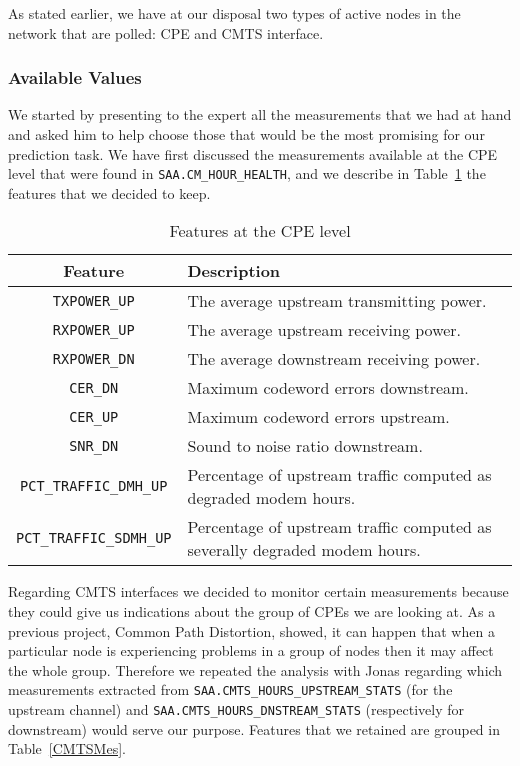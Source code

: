 As stated earlier, we have at our disposal two types of active nodes in the network that are polled: CPE and CMTS interface. 

\subsubsection{Available Values}
We started by presenting to the expert all the measurements that we had at hand and asked him to help choose those that would be the most promising for our prediction task. We have first discussed the measurements available at the CPE level that were found in \texttt{SAA.CM\_HOUR\_HEALTH}, and we describe in Table~\ref{CPEMes} the features that we decided to keep.

\begin{table}[h]
\begin{center}
\begin{tabular}{c l}
\hline
\textbf{Feature} & \textbf{Description}\\ 
\hline\hline
\texttt{TXPOWER\_UP} & The average upstream transmitting power.\\
\hline
\texttt{RXPOWER\_UP} & The average upstream receiving power.\\
\hline
\texttt{RXPOWER\_DN} & The average downstream receiving power.\\
\hline
\texttt{CER\_DN} & Maximum codeword errors downstream.\\
\hline
\texttt{CER\_UP} & Maximum codeword errors upstream.\\
\hline
\texttt{SNR\_DN} & Sound to noise ratio downstream.\\
\hline
\texttt{PCT\_TRAFFIC\_DMH\_UP} & Percentage of upstream traffic computed as degraded modem hours.\\
\hline
\texttt{PCT\_TRAFFIC\_SDMH\_UP} & Percentage of upstream traffic computed as severally degraded modem hours.
\end{tabular}
\end{center}
\caption{\label{CPEMes}Features at the CPE level}
\end{table}

Regarding CMTS interfaces we decided to monitor certain measurements because they could give us indications about the group of CPEs we are looking at. As a previous project, Common Path Distortion, showed, it can happen that when a particular node is experiencing problems in a group of nodes then it may affect the whole group. Therefore we repeated the analysis with Jonas regarding which measurements extracted from \texttt{SAA.CMTS\_HOURS\_UPSTREAM\_STATS} (for the upstream channel) and \texttt{SAA.CMTS\_HOURS\_DNSTREAM\_STATS} (respectively for downstream) would serve our purpose. Features that we retained are grouped in Table~\ref{CMTSMes}.

